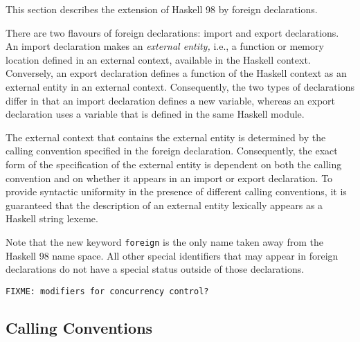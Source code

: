 \documentclass[a4paper,twosides]{article}
\newcommand{\code}[1]{\texttt{#1}}      %
\begin{document}
This section describes the extension of Haskell 98 by foreign declarations.
%
\begin{grammar}
\end{grammar}
%
There are two flavours of foreign declarations: import and export
declarations.  An import declaration makes an \emph{external entity,} i.e., a
function or memory location defined in an external context, available in the
Haskell context.  Conversely, an export declaration defines a function of the
Haskell context as an external entity in an external context.  Consequently,
the two types of declarations differ in that an import declaration defines a
new variable, whereas an export declaration uses a variable that is defined
in the same Haskell module.

The external context that contains the external entity is determined by the
calling convention specified in the foreign declaration.  Consequently, the
exact form of the specification of the external entity is dependent on both
the calling convention and on whether it appears in an import or export
declaration.  To provide syntactic uniformity in the presence of different
calling conventions, it is guaranteed that the description of an external
entity lexically appears as a Haskell string lexeme.

Note that the new keyword \code{foreign} is the only name taken away from the
Haskell 98 name space.  All other special identifiers that may appear in
foreign declarations do not have a special status outside of those
declarations.

\begin{verbatim}
FIXME: modifiers for concurrency control?
\end{verbatim}

\subsection{Calling Conventions}
\label{sec:call-conv}
\end{document}
